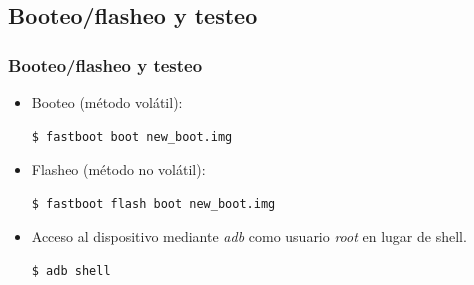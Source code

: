 \subsection{Booteo/flasheo y testeo}
\begin{frame}[fragile]
  \frametitle{Booteo/flasheo y testeo}
  \begin{itemize}
      \item Booteo (método volátil):
      \begin{lstlisting}
$ fastboot boot new_boot.img
      \end{lstlisting}
      
      \item Flasheo (método no volátil):
      \begin{lstlisting}
$ fastboot flash boot new_boot.img
      \end{lstlisting}
      
      \item Acceso al dispositivo mediante \textit{adb} como usuario \textit{root} en lugar de shell.
      \begin{lstlisting}
$ adb shell
      \end{lstlisting}      
  \end{itemize}
\end{frame}
